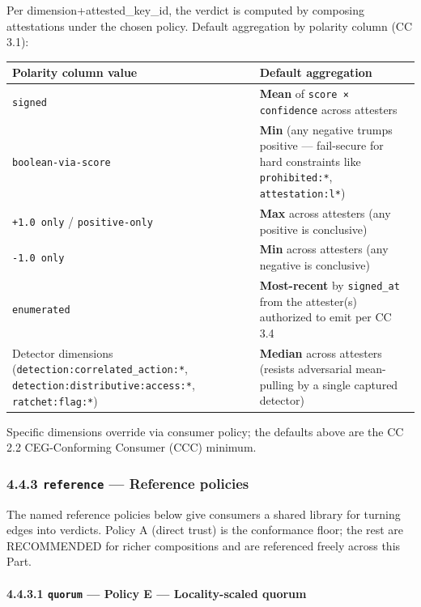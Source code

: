 \documentclass[11pt]{article}
\begin{document}
Per dimension+attested\_key\_id, the verdict is computed by composing attestations under the chosen policy. Default aggregation by polarity column (CC 3.1):


{\footnotesize
\begin{longtable}{|p{8.0cm}|p{8.0cm}|}\hline
\textbf{Polarity column value} & \textbf{Default aggregation} \\ \hline\endhead
\texttt{signed} & \textbf{Mean} of \texttt{score × confidence} across attesters \\ \hline
\texttt{boolean-via-score} & \textbf{Min} (any negative trumps positive — fail-secure for hard constraints like \texttt{prohibited:*}, \texttt{attestation:l*}) \\ \hline
\texttt{+1.0 only} / \texttt{positive-only} & \textbf{Max} across attesters (any positive is conclusive) \\ \hline
\texttt{-1.0 only} & \textbf{Min} across attesters (any negative is conclusive) \\ \hline
\texttt{enumerated} & \textbf{Most-recent} by \texttt{signed\_at} from the attester(s) authorized to emit per CC 3.4 \\ \hline
Detector dimensions (\texttt{detection:correlated\_action:*}, \texttt{detection:distributive:access:*}, \texttt{ratchet:flag:*}) & \textbf{Median} across attesters (resists adversarial mean-pulling by a single captured detector) \\ \hline
\end{longtable}}


Specific dimensions override via consumer policy; the defaults above are the CC 2.2 CEG-Conforming Consumer (CCC) minimum.


\subsubsection*{4.4.3 \texttt{reference} — Reference policies}


The named reference policies below give consumers a shared library for turning edges into verdicts. Policy A (direct trust) is the conformance floor; the rest are RECOMMENDED for richer compositions and are referenced freely across this Part.


\paragraph{4.4.3.1 \texttt{quorum} — Policy E — Locality-scaled quorum}\mbox{}\\
\end{document}
